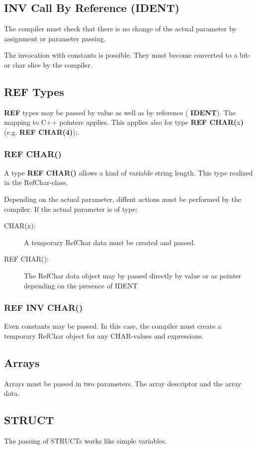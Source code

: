 \subsection{INV Call By Reference (IDENT)}
The compiler must check that there is no change of the actual parameter
by assignment or parameter passing.

The invocation with constants is possible. They must become converted 
to a bit- or char slice by the compiler.

\subsection{REF Types}
\textbf{REF} types may be passed by value as well as by reference 
( \textbf{IDENT}).
The mapping to C++ pointers applies.
This applies also for type \textbf{REF CHAR(}x\textbf{)}
 (e.g. \textbf{REF CHAR(4)});.

\subsubsection{REF CHAR()}
A type \textbf{REF CHAR()} allows a kind of variable string length.
This type realized in the RefChar-class. 

Depending on the actual parameter, diffent actions must be performed 
by the compiler. If the actual parameter is of type:
\begin{description}
\item[CHAR(x):] A temporary RefChar data must be created and passed.
\item[REF CHAR():] The RefChar data object may by passed directly 
   by value or as pointer depending on the presence of IDENT
\end{description}

\subsubsection{REF INV CHAR()}
Even constants may be passed. In this case, the compiler must create
a temporary RefChar object for any CHAR-values and expressions.

\subsection{Arrays}
Arrays must be passed in two parameters. The array descriptor and the 
array data.


 

\subsection{STRUCT}
The passing of STRUCTs works like simple variables.

